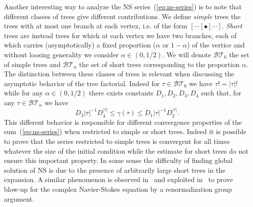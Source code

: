 \documentclass[a4paper]{article}
\newcommand{\1}{{\bf 1}}
\newcommand{\BT}{\mathcal{BT}}
\begin{document}
\medskip
Another interesting way to analyze the NS series~(\ref{eq:ns-series}) is to note that different classes of trees give different
contributions. We define \emph{simple} trees the trees with at most
one branch at each vertex, i.e. of the form $[\cdots [\bullet]\cdots
]$. \emph{Short} trees are instead trees for which at  each  vertex we
have two branches, each of which carries (asymptotically) a fixed proportion ($\alpha$ or $1-\alpha$) of the
vertice and without loosing generality we consider  $\alpha \in (0,1/2)$.
We will denote $\BT_0$ the set of simple trees and $\BT_\alpha$ the
set  of short trees corresponding to the proportion $\alpha$. 
The distinction between these classes of trees is relevant when
discussing the asymptotic behavior of the tree factorial. Indeed
for $\tau \in \BT_0$ we have $\tau! = |\tau|!$ while for any $\alpha
\in (0,1/2)$ there exists constants $D_1,D_2,D_3,D_4$ such that, for any
$\tau \in \BT_\alpha$ we have
$$
 D_3   |\tau|^{-1} D_4^{|\tau|} \le \gamma(\tau) \le D_1   |\tau|^{-1} D_2^{|\tau|}.
$$  
This different behavior  is responsible for
different convergence properties of the sum~(\ref{eq:ns-series}) when
restricted to simple or short trees. Indeed it is possible to prove
that the series restricted to simple trees is convergent for all times
whatever the size of the initial condition while the estimate for
short trees do not ensure this important property. In some sense the
difficulty of finding global solution of NS is due to the presence of
arbitrarily large short trees in the expansion.
A similar phenomenon is observed in~\cite{Sinai3} and exploited in~\cite{MR2390325} to prove blow-up for the complex Navier-Stokes equation by a renormalization group argument.
\end{document}
